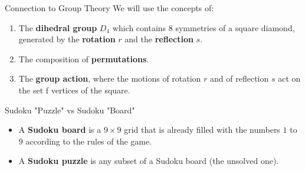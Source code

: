 \documentclass[final]{beamer}
\newlength{\colwidth}
\begin{document}
\begin{frame}[t]
\begin{columns}[t]
\begin{column}{\colwidth}
  \begin{block}{\Large Connection to Group Theory}
   \large We will use the concepts of:
   \begin{enumerate}
       \item The \textbf{dihedral group} $D_4$ which contains $8$ symmetries of a square diamond, generated by the \textbf{rotation} $r$ and the \textbf{reflection} $s$.
       \item The composition of \textbf{permutations}.
       \item The \textbf{group action}, where the motions of rotation $r$ and of reflection $s$ act on the set f vertices of the square.
   \end{enumerate}
  \end{block}

  

\begin{alertblock}{\Large Sudoku "Puzzle" vs Sudoku "Board"}
\large
\begin{itemize}
    \item A \textbf{Sudoku board} is a $9\times9$ grid that is already filled with the numbers $1$ to $9$ according to the rules of the game.
    \item A \textbf{Sudoku puzzle} is any subset of a Sudoku board (the unsolved one).
\end{itemize}
    
  \end{alertblock}


\end{column}
\end{columns}
\end{frame}
\end{document}
